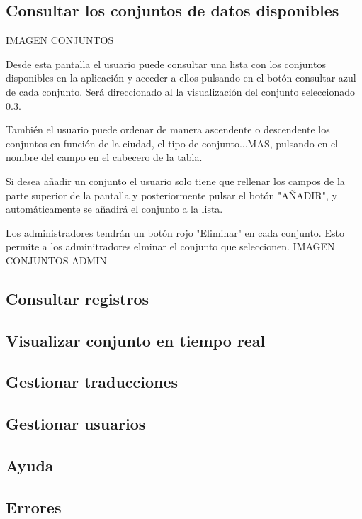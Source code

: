 \subsection{Consultar los conjuntos de datos disponibles}\label{consultar-conjuntos}

IMAGEN CONJUNTOS

Desde esta pantalla el usuario puede consultar una lista con los conjuntos disponibles en la aplicación y acceder a ellos pulsando en el botón consultar azul de cada conjunto. Será direccionado al la visualización del conjunto seleccionado \ref{visualizar-conjunto}.

También el usuario puede ordenar de manera ascendente o descendente los conjuntos en función de la ciudad, el tipo de conjunto...MAS, pulsando en el nombre del campo en el cabecero de la tabla.

Si desea añadir un conjunto el usuario solo tiene que rellenar los campos de la parte superior de  la pantalla y posteriormente pulsar el botón "AÑADIR", y automáticamente se añadirá el conjunto a la lista.

Los administradores tendrán un botón rojo "Eliminar" en cada conjunto. Esto permite a los adminitradores elminar el conjunto que seleccionen.
IMAGEN CONJUNTOS ADMIN

\subsection{Consultar registros}\label{consultar-registros}

\subsection{Visualizar conjunto en tiempo real}\label{visualizar-conjunto}

\subsection{Gestionar traducciones}\label{gestión-traducciones}

\subsection{Gestionar usuarios}\label{gestión-usuarios}

\subsection{Ayuda}\label{consulta-ayuda}

\subsection{Errores}\label{errores}
